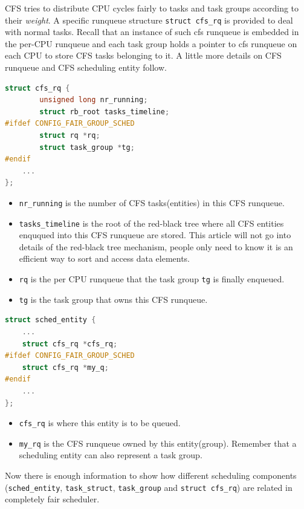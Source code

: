 CFS tries to distribute CPU cycles fairly to tasks and task groups
according to their \emph{weight}. A specific runqueue structure
\texttt{struct cfs\_rq} is provided to deal with normal tasks.  Recall
that an instance of such cfs runqueue is embedded in the per-CPU
runqueue and each task group holds a pointer to cfs runqueue on each
CPU to store CFS tasks belonging to it.  A little more details on CFS
runqueue and CFS scheduling entity follow.
\begin{lstlisting}[language=C,
		caption={\texttt{The CFS runqueue}},
		label={lst:cfsrunqueue}]
struct cfs_rq {
        unsigned long nr_running;
        struct rb_root tasks_timeline;
#ifdef CONFIG_FAIR_GROUP_SCHED
        struct rq *rq;  
        struct task_group *tg;
#endif
	...
};
\end{lstlisting}
\begin{itemize}
\item \texttt{nr\_running} is the number of CFS tasks(entities) in this CFS 
	runqueue.
\item \texttt{tasks\_timeline} is the root of the red-black tree 
	\cite{rbtree} where 
	all CFS entities enququed into this CFS runqueue are stored. 
	This article will not go into details of the red-black tree
	mechanism, people only need to know it is an efficient way 
	to sort and access data elements.
\item \texttt{rq} is the per CPU runqueue that the task group \texttt{tg} 
	is finally enqueued.
\item \texttt{tg} is the task group that owns this CFS runqueue.
\end{itemize}
\begin{lstlisting}[language=C,
			caption={\texttt{The CFS scheduling entity}},
			label={lst:sched_entity}]
struct sched_entity {
	...
	struct cfs_rq *cfs_rq;
#ifdef CONFIG_FAIR_GROUP_SCHED
	struct cfs_rq *my_q;
#endif
	...
}; 
\end{lstlisting}
\begin{itemize}
\item \texttt{cfs\_rq} is where this entity is to be queued.
		
\item \texttt{my\_rq} is the CFS runqueue owned by this entity(group).
	Remember that a scheduling entity can also represent a task group.
\end{itemize}
Now there is enough information to show how different scheduling components
(\texttt{sched\_entity}, \texttt{task\_struct}, \texttt{task\_group}
and \texttt{struct cfs\_rq}) are related in completely fair scheduler.

